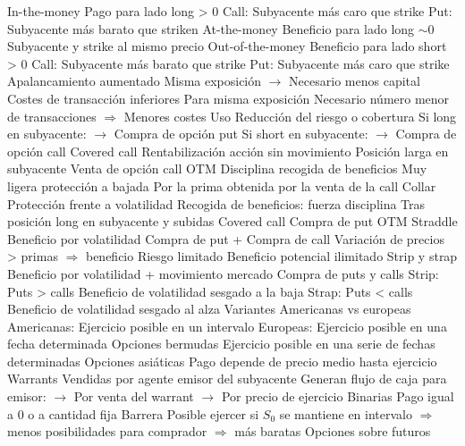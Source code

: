 \documentclass{nuevotema}
\begin{document}
\begin{esquemal}
			\3 In-the-money
				\4 Pago para lado long > 0
				\4 Call:
				\4[] Subyacente más caro que strike
				\4 Put:
				\4[] Subyacente más barato que striken
			\3 At-the-money
				\4 Beneficio para lado long $\sim 0$
				\4 Subyacente y strike al mismo precio
			\3 Out-of-the-money
				\4 Beneficio para lado short > 0
				\4 Call:
				\4[] Subyacente más barato que strike
				\4 Put:
				\4[] Subyacente más caro que strike
			\3 Apalancamiento aumentado
				\4 Misma exposición
				\4[] $\to$ Necesario menos capital
			\3 Costes de transacción inferiores
				\4 Para misma exposición
				\4[] Necesario número menor de transacciones
				\4[] $\Rightarrow$ Menores costes
		\2 Uso
			\3 Reducción del riesgo o cobertura
				\4 Si long en subyacente:
				\4[] $\to$ Compra de opción put
				\4 Si short en subyacente:
				\4[] $\to$ Compra de opción call
			\3 Covered call
				\4 Rentabilización acción sin movimiento
				\4[$\to$] Posición larga en subyacente
				\4[+] Venta de opción call OTM
				\4 Disciplina recogida de beneficios
				\4 Muy ligera protección a bajada
				\4[] Por la prima obtenida por la venta de la call
			\3 Collar
				\4 Protección frente a volatilidad
				\4 Recogida de beneficios: fuerza disciplina
				\4[] Tras posición long en subyacente y subidas
				\4[$\to$] Covered call
				\4[+] Compra de put OTM
			\3 Straddle
				\4 Beneficio por volatilidad
				\4[$\to$] Compra de put + Compra de call
				\4 Variación de precios > primas $\Rightarrow$ beneficio
				\4 Riesgo limitado
				\4 Beneficio potencial ilimitado
			\3 Strip y strap
				\4 Beneficio por volatilidad + movimiento mercado
				\4 Compra de puts y calls
				\4 Strip:
				\4[$\to$] Puts > calls
				\4[] Beneficio de volatilidad sesgado a la baja
				\4 Strap:
				\4[$\to$] Puts < calls
				\4 Beneficio de volatilidad sesgado al alza
		\2 Variantes
			\3 Americanas vs europeas
				\4 Americanas:
				\4[] Ejercicio posible en un intervalo
				\4 Europeas:
				\4[] Ejercicio posible en una fecha determinada
				\4 Opciones bermudas
				\4[] Ejercicio posible en una serie de fechas determinadas
			\3 Opciones asiáticas
				\4 Pago depende de precio medio hasta ejercicio
			\3 Warrants
				\4 Vendidas por agente emisor del subyacente
				\4 Generan flujo de caja para emisor:
				\4[] $\to$ Por venta del warrant
				\4[] $\to$ Por precio de ejercicio
			\3 Binarias
				\4 Pago igual a 0 o a cantidad fija
			\3 Barrera
				\4 Posible ejercer si $S_0$ se mantiene en intervalo
				\4[] $\Rightarrow$ menos posibilidades para comprador
				\4[] $\Rightarrow$ más baratas
			\3 Opciones sobre futuros

\end{esquemal}
\end{document}

